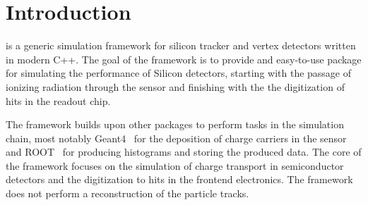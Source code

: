 \section{Introduction}
\label{sec:introduction}
\apsq is a generic simulation framework for silicon tracker and vertex detectors written in modern C++.
The goal of the \apsq framework is to provide and easy-to-use package for simulating the performance of Silicon detectors, starting with the passage of ionizing radiation through the sensor and finishing with the the digitization of hits in the readout chip.

The framework builds upon other packages to perform tasks in the simulation chain, most notably Geant4~\cite{geant4} for the deposition of charge carriers in the sensor and ROOT~\cite{root} for producing histograms and storing the produced data.
The core of the framework focuses on the simulation of charge transport in semiconductor detectors and the digitization to hits in the frontend electronics.
The framework does not perform a reconstruction of the particle tracks.

